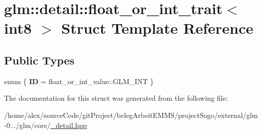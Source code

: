 \hypertarget{structglm_1_1detail_1_1float__or__int__trait_3_01int8_01_4}{\section{glm\-:\-:detail\-:\-:float\-\_\-or\-\_\-int\-\_\-trait$<$ int8 $>$ Struct Template Reference}
\label{structglm_1_1detail_1_1float__or__int__trait_3_01int8_01_4}
}
\subsection*{Public Types}
\begin{DoxyCompactItemize}
\item 
enum \{ {\bfseries I\-D} = float\-\_\-or\-\_\-int\-\_\-value\-:\-:G\-L\-M\-\_\-\-I\-N\-T
 \}
\end{DoxyCompactItemize}


The documentation for this struct was generated from the following file\-:\begin{DoxyCompactItemize}
\item 
/home/alex/source\-Code/git\-Project/beleg\-Arbeit\-E\-M\-M\-S/project\-Sogo/external/glm-\/0.../glm/core/\hyperlink{__detail_8hpp}{\-\_\-detail.\-hpp}\end{DoxyCompactItemize}
